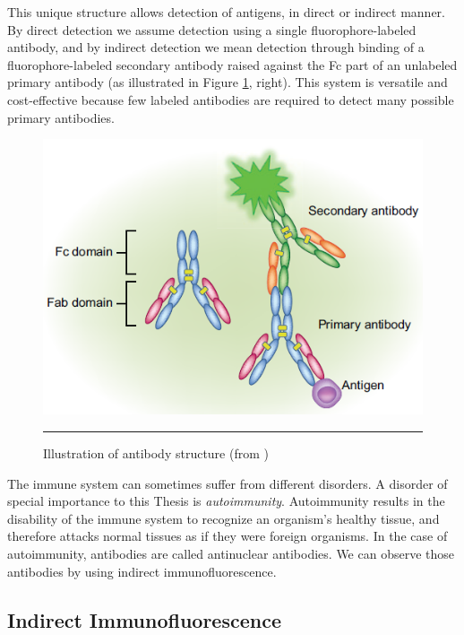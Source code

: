 This unique structure allows detection of antigens, in direct or indirect manner. By direct detection we assume detection using a single fluorophore-labeled antibody, and by indirect detection we mean detection through binding of a fluorophore-labeled secondary antibody raised against the Fc part of an unlabeled primary antibody (as illustrated in Figure \ref{fig:AntibodyIllustration}, right). This system is versatile and cost-effective because few labeled antibodies are required to detect many possible primary antibodies. \\


\begin{figure}[htbp]
	\centering
	\includegraphics[scale=0.5]{Figures/Domain/antibodies}
	\rule{35em}{0.5pt}
	\caption[Illustration of antibody structure]{Illustration of antibody structure (from \cite{OdellCook2013})}
	\label{fig:AntibodyIllustration}

\end{figure}

The immune system can sometimes suffer from different disorders. A disorder of special importance to this Thesis is  \textit{autoimmunity}. Autoimmunity results in the disability of the immune system to recognize an organism's healthy tissue, and therefore attacks normal tissues as if they were foreign organisms. In the case of autoimmunity, antibodies are called antinuclear antibodies. We can observe those antibodies by using indirect immunofluorescence. \\

\subsection{Indirect Immunofluorescence}

